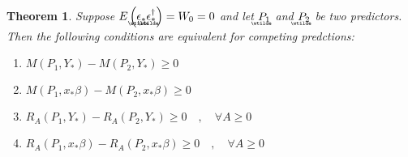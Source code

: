 \documentclass{article}
\newtheorem{theorem}{Theorem}
\begin{document}
\begin{theorem}
Suppose $E\left( 
\underaccent{\wtilde}{\epsilon}%
_{\ast }%
\underaccent{\wtilde}{\epsilon}%
_{\ast }^{\dagger }\right) =W_{0}=0$ and let $%
\underaccent{\wtilde}{P}%
_{1}$ and $%
\underaccent{\wtilde}{P}%
_{2}$ be two predictors. Then the following conditions are equivalent for
competing predctions:

\begin{enumerate}
\item $M\left( P_{1},Y_{\ast }\right) -M\left( P_{2},Y_{\ast }\right) \geq 0$

\item $M\left( P_{1},x_{\ast }\beta \right) -M\left( P_{2},x_{\ast }\beta
\right) \geq 0$

\item $R_{A}\left( P_{1},Y_{\ast }\right) -R_{A}\left( P_{2},Y_{\ast
}\right) \geq 0\quad ,\quad \forall A\geq 0$

\item $R_{A}\left( P_{1},x_{\ast }\beta \right) -R_{A}\left( P_{2},x_{\ast
}\beta \right) \geq 0\quad ,\quad \forall A\geq 0$
\end{enumerate}
\end{theorem}
\end{document}

